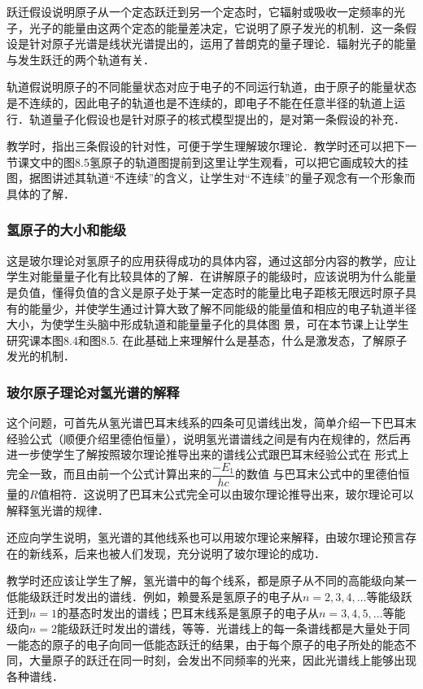 跃迁假设说明原子从一个定态跃迁到另一个定态时，它辐射或吸收一定频率的光子，光子的能量由这两个定态的能量差决定，它说明了原子发光的机制．这一条假设是针对原子光谱是线状光谱提出的，运用了普朗克的量子理论．辐射光子的能量与发生跃迁的两个轨道有关．

轨道假说明原子的不同能量状态对应于电子的不同运行轨道，由于原子的能量状态是不连续的，因此电子的轨道也是不连续的，即电子不能在任意半径的轨道上运行．轨道量子化假设也是针对原子的核式模型提出的，是对第一条假设的补充．

教学时，指出三条假设的针对性，可便于学生理解玻尔理论．教学时还可以把下一节课文中的图8.5氢原子的轨道图提前到这里让学生观看，可以把它画成较大的挂图，据图讲述其轨道“不连续”的含义，让学生对“不连续”的量子观念有一个形象而具体的了解．

\subsubsection{氢原子的大小和能级} 

这是玻尔理论对氢原子的应用获得成功的具体内容，通过这部分内容的教学，应让学生对能量量子化有比较具体的了解．在讲解原子的能级时，应该说明为什么能量是负值，懂得负值的含义是原子处于某一定态时的能量比电子距核无限远时原子具有的能量少，并使学生通过计算大致了解不同能级的能量值和相应的电子轨道半径大小，为使学生头脑中形成轨道和能量量子化的具体图
景，可在本节课上让学生研究课本图8.4和图8.5. 在此基础上来理解什么是基态，什么是激发态，了解原子发光的机制．

\subsubsection{玻尔原子理论对氢光谱的解释}

这个问题，可首先从氢光谱巴耳末线系的四条可见谱线出发，简单介绍一下巴耳末经验公式（顺便介绍里德伯恒量），说明氢光谱谱线之间是有内在规律的，然后再进一步使学生了解按照玻尔理论推导出来的谱线公式跟巴耳末经验公式在
形式上完全一致，而且由前一个公式计算出来的$\dfrac{-E_1}{hc}$的数值
与巴耳末公式中的里德伯恒量的$R$值相符．这说明了巴耳末公式完全可以由玻尔理论推导出来，玻尔理论可以解释氢光谱的规律．

还应向学生说明，氢光谱的其他线系也可以用玻尔理论来解释，由玻尔理论预言存在的新线系，后来也被人们发现，充分说明了玻尔理论的成功．

教学时还应该让学生了解，氢光谱中的每个线系，都是原子从不同的高能级向某一低能级跃迁时发出的谱线．例如，赖曼系是氢原子的电子从$n=2, 3, 4,\ldots$等能级跃迁到$n=1$的基态时发出的谱线；巴耳末线系是氢原子的电子从$n=3, 4, 5,\ldots$等能级向$n=2$能级跃迁时发出的谱线，等等．光谱线上的每一条谱线都是大量处于同一能态的原子的电子向同一低能态跃迁的结果，由于每个原子的电子所处的能态不同，大量原子的跃迁在同一时刻，会发出不同频率的光来，因此光谱线上能够出现各种谱线．

